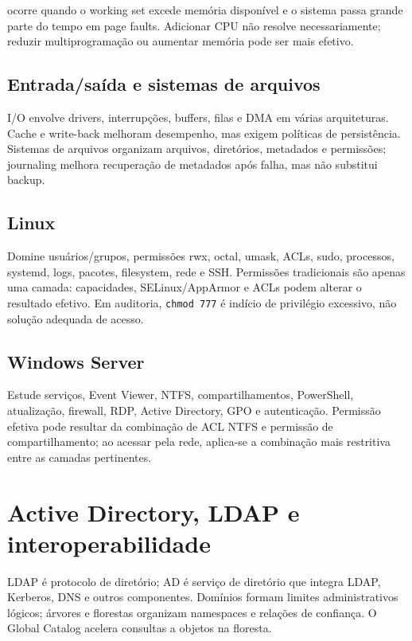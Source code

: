  ocorre quando o working set excede memória disponível e o sistema passa grande parte do tempo em page faults. Adicionar CPU não resolve necessariamente; reduzir multiprogramação ou aumentar memória pode ser mais efetivo.

\subsection{Entrada/saída e sistemas de arquivos}

I/O envolve drivers, interrupções, buffers, filas e DMA em várias arquiteturas. Cache e write-back melhoram desempenho, mas exigem políticas de persistência. Sistemas de arquivos organizam arquivos, diretórios, metadados e permissões; journaling melhora recuperação de metadados após falha, mas não substitui backup.

\subsection{Linux}

Domine usuários/grupos, permissões rwx, octal, umask, ACLs, sudo, processos, systemd, logs, pacotes, filesystem, rede e SSH. Permissões tradicionais são apenas uma camada: capacidades, SELinux/AppArmor e ACLs podem alterar o resultado efetivo. Em auditoria, \texttt{chmod 777} é indício de privilégio excessivo, não solução adequada de acesso.

\subsection{Windows Server}

Estude serviços, Event Viewer, NTFS, compartilhamentos, PowerShell, atualização, firewall, RDP, Active Directory, GPO e autenticação. Permissão efetiva pode resultar da combinação de ACL NTFS e permissão de compartilhamento; ao acessar pela rede, aplica-se a combinação mais restritiva entre as camadas pertinentes.

\section{Active Directory, LDAP e interoperabilidade}

LDAP é protocolo de diretório; AD é serviço de diretório que integra LDAP, Kerberos, DNS e outros componentes. Domínios formam limites administrativos lógicos; árvores e florestas organizam namespaces e relações de confiança. O Global Catalog acelera consultas a objetos na floresta.

